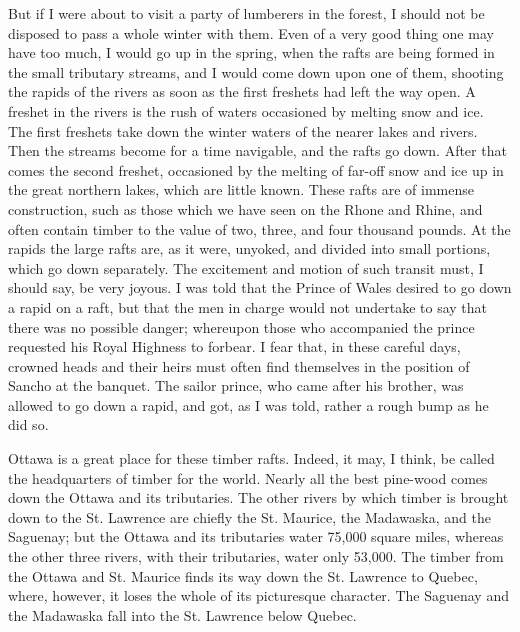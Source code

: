 But if I were about to visit a party of lumberers in the forest, I
should not be disposed to pass a whole winter with them.  Even of a
very good thing one may have too much, I would go up in the spring,
when the rafts are being formed in the small tributary streams, and
I would come down upon one of them, shooting the rapids of the
rivers as soon as the first freshets had left the way open.  A
freshet in the rivers is the rush of waters occasioned by melting
snow and ice.  The first freshets take down the winter waters of
the nearer lakes and rivers.  Then the streams become for a time
navigable, and the rafts go down.  After that comes the second
freshet, occasioned by the melting of far-off snow and ice up in
the great northern lakes, which are little known.  These rafts are
of immense construction, such as those which we have seen on the
Rhone and Rhine, and often contain timber to the value of two,
three, and four thousand pounds.  At the rapids the large rafts
are, as it were, unyoked, and divided into small portions, which go
down separately.  The excitement and motion of such transit must, I
should say, be very joyous.  I was told that the Prince of Wales
desired to go down a rapid on a raft, but that the men in charge
would not undertake to say that there was no possible danger;
whereupon those who accompanied the prince requested his Royal
Highness to forbear.  I fear that, in these careful days, crowned
heads and their heirs must often find themselves in the position of
Sancho at the banquet.  The sailor prince, who came after his
brother, was allowed to go down a rapid, and got, as I was told,
rather a rough bump as he did so.

Ottawa is a great place for these timber rafts.  Indeed, it may, I
think, be called the headquarters of timber for the world.  Nearly
all the best pine-wood comes down the Ottawa and its tributaries.
The other rivers by which timber is brought down to the St.
Lawrence are chiefly the St. Maurice, the Madawaska, and the
Saguenay; but the Ottawa and its tributaries water 75,000 square
miles, whereas the other three rivers, with their tributaries,
water only 53,000.  The timber from the Ottawa and St. Maurice
finds its way down the St. Lawrence to Quebec, where, however, it
loses the whole of its picturesque character.  The Saguenay and the
Madawaska fall into the St. Lawrence below Quebec.

